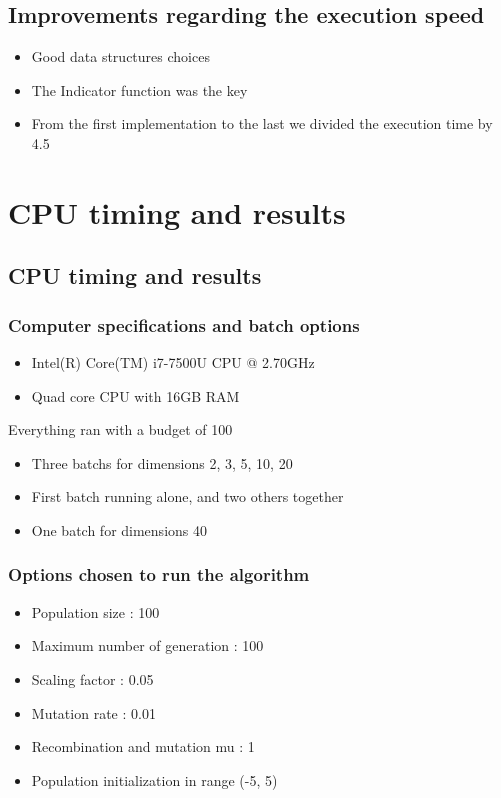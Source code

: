 \documentclass{beamer}
\begin{document}
\subsection{Improvements regarding the execution speed}
\begin{frame}
\begin{itemize}
\item Good data structures choices
\item The Indicator function was the key
\item From the first implementation to the last we divided the execution time by 4.5
\end{itemize}
\end{frame}

\section{CPU timing and results}
\subsection{CPU timing and results}
\begin{frame}
  \frametitle{Computer specifications and batch options}
  \begin{itemize}
  \item Intel(R) Core(TM) i7-7500U CPU @ 2.70GHz
  \item Quad core CPU with 16GB RAM
  \end{itemize}
  \vspace{1em}
  Everything ran with a budget of 100\\
  \begin{itemize}
  \item Three batchs for dimensions 2, 3, 5, 10, 20
  \item First batch running alone, and two others together
  \item One batch for dimensions 40
  \end{itemize}
\end{frame}

\begin{frame}
  \frametitle{Options chosen to run the algorithm}
  \begin{itemize}
  \item Population size : 100
  \item Maximum number of generation : 100
  \item Scaling factor : 0.05
  \item Mutation rate : 0.01
  \item Recombination and mutation mu : 1
  \item Population initialization in range (-5, 5)
  \end{itemize}
\end{frame}
\end{document}

